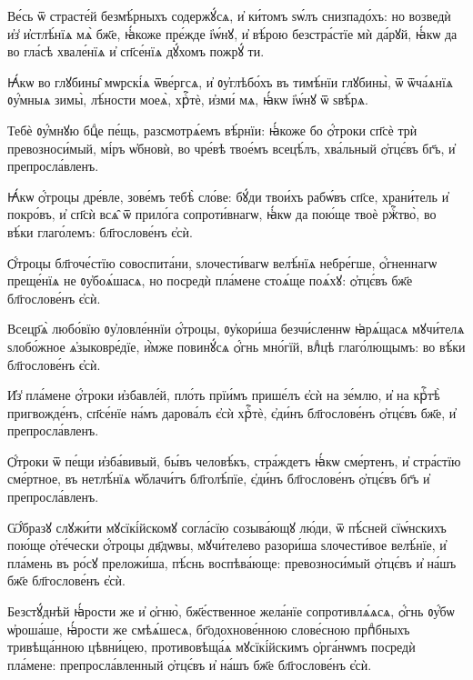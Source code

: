 \hKv Ве́сь ѿ страсте́й безмѣ́рныхъ содержꙋ́сѧ, и҆ ки́томъ ѕѡ́лъ  снизпадо́хъ: но возведѝ и҆з̾ и҆стлѣ́нїѧ мѧ̀ бж҃е, ꙗ҆́коже пре́жде  і҆ѡ́нꙋ, и҆ вѣ́рою безстра́стїе мѝ да́рꙋй, ꙗ҆́кѡ да во гла́сѣ  хвале́нїѧ и҆ сп҃се́нїѧ дꙋ́хомъ пожрꙋ́ ти.  

\hKv Ꙗ҆́кѡ во глꙋбины̑ мѡрскі́ѧ ѿве́ргсѧ, и҆ ᲂу҆глѣбо́хъ въ  тимѣ́нїи глꙋбины̀, ѿ ѿча́ѧнїѧ ᲂу҆́мныѧ зимы̀, лѣ́ности моеѧ̀,  хрⷭ҇тѐ, и҆зми́ мѧ, ꙗ҆́кѡ і҆ѡ́нꙋ ѿ ѕвѣ́рѧ. 
%

\hKv Тебѐ ᲂу҆́мнꙋю бцⷣе пе́щь, разсмотрѧ́емъ вѣ́рнїи: ꙗ҆́коже бо  ѻ҆́троки сп҃сѐ трѝ превозноси́мый, мі́ръ ѡ҆бновѝ, во чре́вѣ  твое́мъ всецѣ́лъ, хва́льный ѻ҆тцє́въ бг҃ъ, и҆ препросла́вленъ. 

\hKv Ꙗ҆́кѡ ѻ҆́троцы дре́вле, зове́мъ тебѣ̀ сло́ве: бꙋ́ди твои́хъ  рабѡ́въ сп҃се, храни́тель и҆ покро́въ, и҆ сп҃сѝ всѧ̑ ѿ прило́га  сопроти́внагѡ, ꙗ҆́кѡ да пою́ще твоѐ ржⷭ҇тво̀, во вѣ́ки глаго́лемъ:  бл҃гослове́нъ є҆сѝ. 
%

\hKv Ѻ҆́троцы бл҃гоче́стїю совоспита́ни,  ѕлочести́вагѡ велѣ́нїѧ небре́гше, ѻ҆́гненнагѡ преще́нїѧ не  ᲂу҆боѧ́шасѧ, но посредѝ  пла́мене  стоѧ́ще поѧ́хꙋ: ѻ҆тцє́въ бж҃е бл҃гослове́нъ є҆сѝ. 

\hKv Всецр҃ѧ̀ любо́вїю ᲂу҆ловле́ннїи ѻ҆́троцы, ᲂу҆кори́ша  безчи́сленнѡ ꙗ҆рѧ́щасѧ мꙋчи́телѧ ѕлобо́жное ѧ҆зыковре́дїе, и҆̀мже  повинꙋ́сѧ ѻ҆́гнь мно́гїй, влⷣцѣ глаго́лющымъ: во вѣ́ки  бл҃гослове́нъ є҆сѝ.  
%

\hKv И҆з̾ пла́мене ѻ҆́троки и҆збавле́й, пло́ть прїи́мъ  прише́лъ є҆сѝ на зе́млю, и҆ на крⷭ҇тѣ̀ пригвожде́нъ, сп҃се́нїе  на́мъ дарова́лъ є҆сѝ хрⷭ҇тѐ, є҆ди́нъ бл҃гослове́нъ ѻ҆тцє́въ бж҃е,  и҆ препросла́вленъ.  
%

\hKv Ѻ҆́троки ѿ пе́щи и҆зба́вивый, бы́въ человѣ́къ,  стра́ждетъ ꙗ҆́кѡ сме́ртенъ, и҆ стра́стїю сме́ртное, въ нетлѣ́нїѧ  ѡ҆блачи́тъ бл҃голѣ́пїе, є҆ди́нъ бл҃гослове́нъ ѻ҆тцє́въ бг҃ъ и҆  препросла́вленъ. 
%

\hKv Ѡ҆́бразꙋ слꙋжи́ти мꙋсїкі́йскомꙋ согла́сїю созыва́ющꙋ  лю́ди, ѿ пѣ́сней сїѡ́нскихъ пою́ще ѻ҆те́чески ѻ҆́троцы дв҃дѡвы,   мꙋчи́телево разори́ша ѕлочести́вое  велѣ́нїе, и҆ пла́мень въ ро́сꙋ преложи́ша, пѣ́снь воспѣва́юще:  превозноси́мый ѻ҆тцє́въ и҆ на́шъ бж҃е бл҃гослове́нъ є҆сѝ. 
%

\hKv Безстꙋ́днѣй ꙗ҆́рости же и҆ ѻ҆гню̀,  бж҃е́ственное жела́нїе сопротивлѧ́ѧсѧ, ѻ҆́гнь ᲂу҆́бѡ ѡ҆роша́ше,  ꙗ҆́рости же смѣѧ́шесѧ, бг҃одохнове́нною слове́сною прпⷣбныхъ  тривѣща́нною цѣвни́цею, противовѣща́ѧ мꙋсїкі́йскимъ ѻ҆рга́нѡмъ  посредѝ пла́мене: препросла́вленный ѻ҆тцє́въ и҆ на́шъ бж҃е  бл҃гослове́нъ є҆сѝ. 
%

